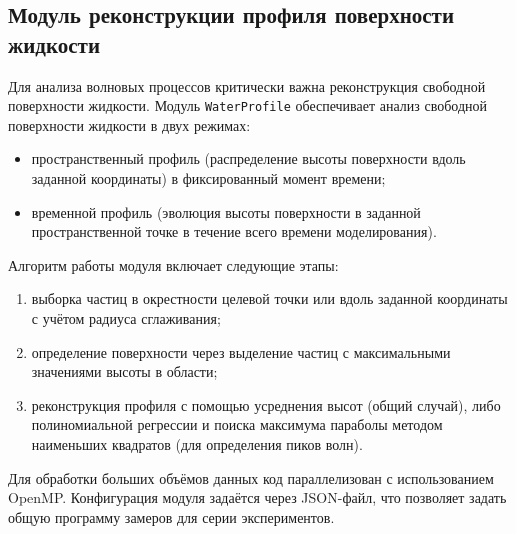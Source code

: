 \subsection{Модуль реконструкции профиля поверхности жидкости}

Для анализа волновых процессов критически важна реконструкция свободной поверхности жидкости.
%
Модуль \verb|WaterProfile| обеспечивает анализ свободной поверхности жидкости в двух режимах:
\begin{itemize}
    \item пространственный профиль (распределение высоты поверхности вдоль заданной координаты)
    в фиксированный момент времени;
    \item временной профиль (эволюция высоты поверхности в заданной пространственной точке в течение всего времени моделирования).
\end{itemize}

Алгоритм работы модуля включает следующие этапы:
\begin{enumerate}
    \item выборка частиц в окрестности целевой точки или вдоль заданной координаты с учётом радиуса сглаживания;
    \item определение поверхности через выделение частиц с максимальными значениями высоты в области;
    \item реконструкция профиля с помощью усреднения высот (общий случай),
        либо полиномиальной регрессии и поиска максимума параболы методом наименьших квадратов (для определения пиков волн).
\end{enumerate}

Для обработки больших объёмов данных код параллелизован с использованием OpenMP.
Конфигурация модуля задаётся через JSON-файл, что позволяет задать общую программу замеров для серии экспериментов.

\FloatBarrier
